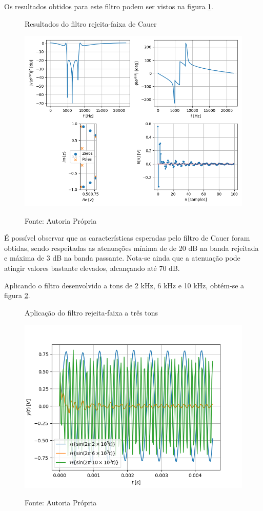 \documentclass[12pt,a4paper]{report}
\begin{document}
  Os resultados obtidos para este filtro podem ser vistos na figura \ref{fig:cauer_results}.
  \begin{figure}[H]
    \caption{Resultados do filtro rejeita-faixa de Cauer}
    \centering
    \includegraphics[width=\textwidth]{images/cauer_results}
    \label{fig:cauer_results}
    \caption*{Fonte: Autoria Própria}
  \end{figure}

  É possível observar que as características esperadas pelo filtro de Cauer foram obtidas, sendo respeitadas
  as atenuações mínima de de 20 dB na banda rejeitada e máxima de 3 dB na banda passante. Nota-se ainda que
  a atenuação pode atingir valores bastante elevados, alcançando até 70 dB.

  Aplicando o filtro desenvolvido a tons de 2 kHz, 6 kHz e 10 kHz, obtém-se a figura \ref{fig:cauer_tones}.
  \begin{figure}[H]
    \caption{Aplicação do filtro rejeita-faixa a três tons}
    \centering
    \includegraphics[width=\textwidth]{images/cauer_tones}
    \label{fig:cauer_tones}
    \caption*{Fonte: Autoria Própria}
  \end{figure}
\end{document}
